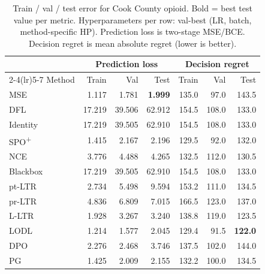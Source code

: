 \begin{table}[h]
\centering
\caption[Train/val/test error for Cook County opioid.]{Train / val / test error for Cook County opioid. Bold = best test value per metric. Hyperparameters per row: val-best (LR, batch, method-specific HP). Prediction loss is two-stage MSE/BCE. Decision regret is mean absolute regret (lower is better).}
\label{tab:err-cook-county}
\setlength{\tabcolsep}{4pt}
\renewcommand{\arraystretch}{1.05}
\begin{tabular}{@{}lrrrrrr@{}}
\toprule
& \multicolumn{3}{c}{Prediction loss} & \multicolumn{3}{c}{Decision regret} \\
\cmidrule(lr){2-4}\cmidrule(lr){5-7}
Method & Train & Val & Test & Train & Val & Test \\
\midrule
MSE & 1.117 & 1.781 & \textbf{1.999} & 135.0 & 97.0 & 143.5 \\
DFL & 17.219 & 39.506 & 62.912 & 154.5 & 108.0 & 133.0 \\
Identity & 17.219 & 39.505 & 62.910 & 154.5 & 108.0 & 133.0 \\
SPO\textsuperscript{+} & 1.415 & 2.167 & 2.196 & 129.5 & 92.0 & 132.0 \\
NCE & 3.776 & 4.488 & 4.265 & 132.5 & 112.0 & 130.5 \\
Blackbox & 17.219 & 39.505 & 62.910 & 154.5 & 108.0 & 133.0 \\
pt-LTR & 2.734 & 5.498 & 9.594 & 153.2 & 111.0 & 134.5 \\
pr-LTR & 4.836 & 6.809 & 7.015 & 166.5 & 123.0 & 137.0 \\
L-LTR & 1.928 & 3.267 & 3.240 & 138.8 & 119.0 & 123.5 \\
LODL & 1.214 & 1.577 & 2.045 & 129.4 & 91.5 & \textbf{122.0} \\
DPO & 2.276 & 2.468 & 3.746 & 137.5 & 102.0 & 144.0 \\
PG & 1.425 & 2.009 & 2.155 & 132.2 & 100.0 & 134.5 \\
\bottomrule
\end{tabular}
\end{table}

